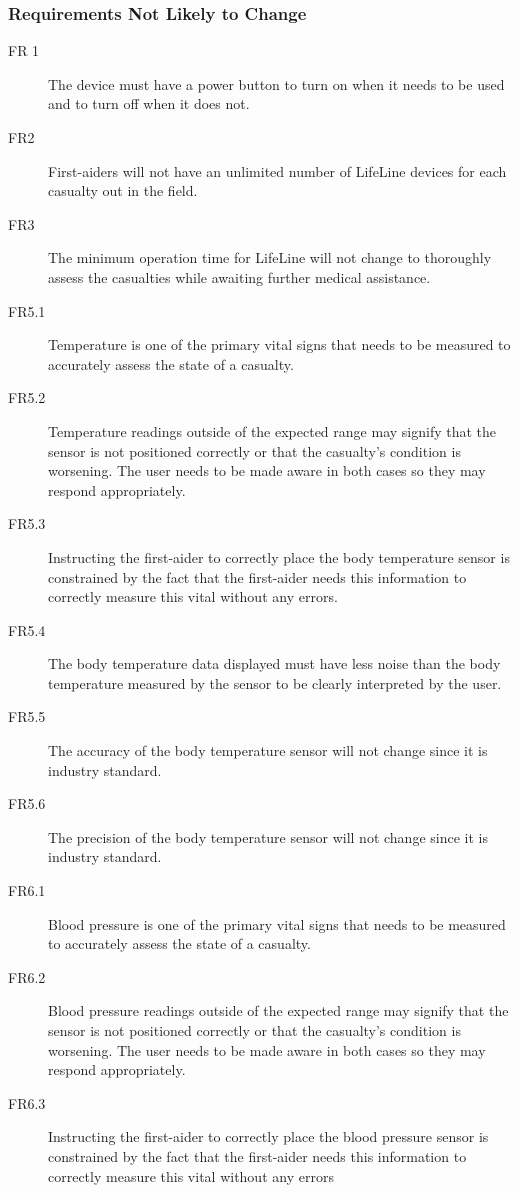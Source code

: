 \documentclass{article}
\begin{document}
    \subsubsection{Requirements Not Likely to Change}
        \begin{description}
            \item[FR 1] The device must have a power button to turn on when it needs to be used and to turn off when it does not. 
            \item[FR2] First-aiders will not have an unlimited number of LifeLine devices for each casualty out in the field. 
            \item[FR3] The minimum operation time for LifeLine will not change to thoroughly assess the casualties while awaiting further medical assistance.
            \item[FR5.1] Temperature is one of the primary vital signs that needs to be measured to accurately assess the state of a casualty.
            \item[FR5.2] Temperature readings outside of the expected range may signify that the sensor is not positioned correctly or that the casualty's condition is worsening. The user needs to be made aware in both cases so they may respond appropriately. 
            \item[FR5.3] Instructing the first-aider to correctly place the body temperature sensor is constrained by the fact that the first-aider needs this information to correctly measure this vital without any errors.
            \item[FR5.4] The body temperature data displayed must have less noise than the body temperature measured by the sensor to be clearly interpreted by the user.  
            \item[FR5.5] The accuracy of the body temperature sensor will not change since it is industry standard.
            \item[FR5.6] The precision of the body temperature sensor will not change since it is industry standard.
            \item[FR6.1] Blood pressure is one of the primary vital signs that needs to be measured to accurately assess the state of a casualty.
            \item[FR6.2] Blood pressure readings outside of the expected range may signify that the sensor is not positioned correctly or that the casualty's condition is worsening. The user needs to be made aware in both cases so they may respond appropriately. 
            \item[FR6.3] Instructing the first-aider to correctly place the blood pressure sensor is constrained by the fact that the first-aider needs this information to correctly measure this vital without any errors

\end{description}
\end{document}
